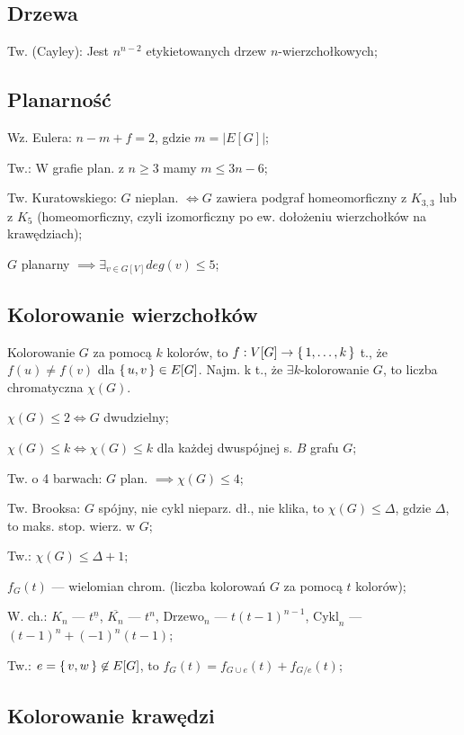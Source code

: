 \subsection{Drzewa}

Tw. (Cayley): Jest $n^{n-2}$ etykietowanych drzew $n$-wierzchołkowych;

\subsection{Planarność}

Wz. Eulera: $n - m + f = 2$, gdzie $m = |E[G]|$;

Tw.: W grafie plan. z $n \geq 3$ mamy $m \leq 3n -6$;

Tw. Kuratowskiego: $G$ nieplan. $\iff G$ zawiera podgraf homeomorficzny
  z $K_{3,3}$ lub z $K_5$ (homeomorficzny, czyli
  izomorficzny po ew. dołożeniu wierzchołków na krawędziach);

$G$ planarny $\implies \exists_{v \in G[V]} deg(v) \leq 5$;

\subsection{Kolorowanie wierzchołków}

Kolorowanie $G$ za pomocą $k$ kolorów, to
  $f: V[G] \rightarrow \set{1, \dots, k}$ t., że $f(u) \neq f(v)$ dla
  $\set{u, v} \in E[G]$. Najm. k t., że $\exists k$-kolorowanie $G$, to liczba
  chromatyczna $\chi (G)$.

$\chi(G) \leq 2 \Leftrightarrow G$ dwudzielny;

$\chi(G) \leq k \Leftrightarrow \chi(G) \leq k$ dla każdej dwuspójnej s. $B$
  grafu $G$;

Tw. o 4 barwach: $G$ plan. $\implies\chi(G)\leq 4$;

Tw. Brooksa: $G$ spójny, nie cykl nieparz. dł., nie klika, to
  $\chi(G) \leq \Delta$, gdzie $\Delta$, to maks. stop. wierz. w $G$;

Tw.: $\chi(G) \leq \Delta + 1$;

$f_G(t)$ --- wielomian chrom. (liczba kolorowań $G$ za pomocą $t$ kolorów);

W. ch.:
$K_n$ --- $t^{\underline{n}}$,
$\overline{K_n}$ --- $t^n$,
$\text{Drzewo}_n$ --- $t(t-1)^{n-1}$,
$\text{Cykl}_n$ --- $(t-1)^n + (-1)^n(t-1)$;

Tw.: $e = \set{v, w} \not\in E[G]$, to $f_G(t)=f_{G\cup e}(t) + f_{G/e}(t)$;

\subsection{Kolorowanie krawędzi}

